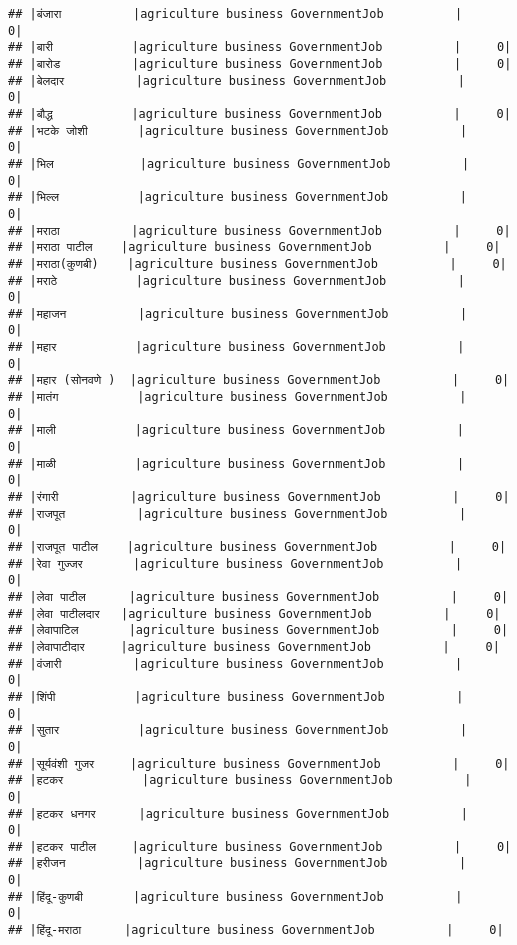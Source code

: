 \documentclass[
]{article}
\begin{document}
\begin{verbatim}
## |बंजारा          |agriculture business GovernmentJob          |     0|
## |बारी           |agriculture business GovernmentJob          |     0|
## |बारोड          |agriculture business GovernmentJob          |     0|
## |बेलदार          |agriculture business GovernmentJob          |     0|
## |बौद्ध           |agriculture business GovernmentJob          |     0|
## |भटके जोशी       |agriculture business GovernmentJob          |     0|
## |भिल            |agriculture business GovernmentJob          |     0|
## |भिल्ल           |agriculture business GovernmentJob          |     0|
## |मराठा          |agriculture business GovernmentJob          |     0|
## |मराठा पाटील    |agriculture business GovernmentJob          |     0|
## |मराठा(कुणबी)    |agriculture business GovernmentJob          |     0|
## |मराठे           |agriculture business GovernmentJob          |     0|
## |महाजन          |agriculture business GovernmentJob          |     0|
## |महार           |agriculture business GovernmentJob          |     0|
## |महार (सोनवणे )  |agriculture business GovernmentJob          |     0|
## |मातंग           |agriculture business GovernmentJob          |     0|
## |माली           |agriculture business GovernmentJob          |     0|
## |माळी           |agriculture business GovernmentJob          |     0|
## |रंगारी          |agriculture business GovernmentJob          |     0|
## |राजपूत          |agriculture business GovernmentJob          |     0|
## |राजपूत पाटील    |agriculture business GovernmentJob          |     0|
## |रेवा गुज्जर       |agriculture business GovernmentJob          |     0|
## |लेवा पाटील      |agriculture business GovernmentJob          |     0|
## |लेवा पाटीलदार   |agriculture business GovernmentJob          |     0|
## |लेवापाटिल       |agriculture business GovernmentJob          |     0|
## |लेवापाटीदार     |agriculture business GovernmentJob          |     0|
## |वंजारी          |agriculture business GovernmentJob          |     0|
## |शिंपी           |agriculture business GovernmentJob          |     0|
## |सुतार           |agriculture business GovernmentJob          |     0|
## |सूर्यवंशी गुजर     |agriculture business GovernmentJob          |     0|
## |हटकर           |agriculture business GovernmentJob          |     0|
## |हटकर धनगर      |agriculture business GovernmentJob          |     0|
## |हटकर पाटील     |agriculture business GovernmentJob          |     0|
## |हरीजन          |agriculture business GovernmentJob          |     0|
## |हिंदू-कुणबी       |agriculture business GovernmentJob          |     0|
## |हिंदू-मराठा      |agriculture business GovernmentJob          |     0|

\end{verbatim}
\end{document}

